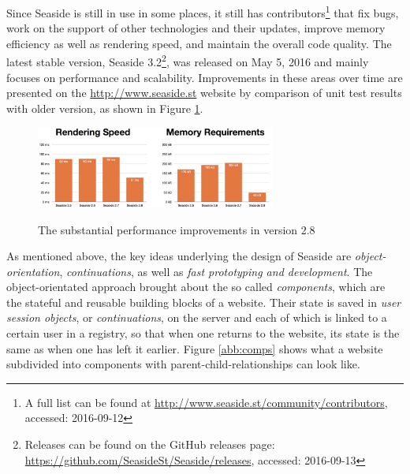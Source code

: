 \documentclass[a4paper,12pt,pagesize,headsepline,oribibl,titlepage]{scrartcl}
\begin{document}
Since Seaside is still in use in some places, it still has contributors\footnote{A full list can be found at \url{http://www.seaside.st/community/contributors}, accessed: 2016-09-12} that fix bugs, work on the support of other technologies and their updates, improve memory efficiency as well as rendering speed, and maintain the overall code quality. 
The latest stable version, Seaside 3.2\footnote{Releases can be found on the GitHub releases page: \url{https://github.com/SeasideSt/Seaside/releases}, accessed: 2016-09-13}, was released on May 5, 2016 and mainly focuses on performance and scalability. Improvements in these areas over time are presented on the \url{http://www.seaside.st} website by comparison of unit test results with older version, as shown in Figure \ref{fig:performance}.

\begin{figure}[hbp]
\begin{center}
\includegraphics*[width=0.7\textwidth]{images/performance.png}\\
\caption{The substantial performance improvements in version 2.8}
\label{fig:performance}
\end{center}
\end{figure}

As mentioned above, the key ideas underlying the design of Seaside are \emph{object-orientation}, \emph{continuations}, as well as \emph{fast prototyping and development}.
The object-orientated approach brought about the so called \emph{components}, which are the stateful and reusable building  blocks of a website. Their state is saved in \emph{user session objects}, or \emph{continuations}, on the server and each of which is linked to a certain user in a registry, so that when one returns to the website, its state is the same as when one has left it earlier. Figure \ref{abb:comps} shows what a website subdivided into components with parent-child-relationships can look like.
\end{document}
